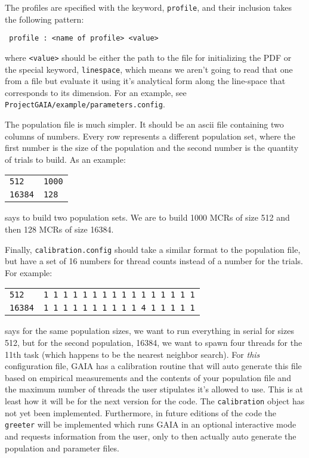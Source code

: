 \documentclass[10pt,a4paper,final]{article}
\numberwithin{equation}{section}
\newenvironment{Table}
  {\par\bigskip\noindent\minipage{\columnwidth}\centering}
    {\endminipage\par\bigskip}
\begin{document}
\begin{multicols}{2}[]
			The profiles are specified with the keyword, \texttt{profile}, and their
			inclusion takes the following pattern:

			\begin{center}
				\texttt{ profile : <name of profile> <value> }
			\end{center}

			\noindent
			where \texttt{<value>} should be either the path to the file for initializing
			the PDF or the special keyword, \texttt{linespace}, which means we aren't
			going to read that one from a file but evaluate it using it's analytical form
			along the line-space that corresponds to its dimension. For an example, see
			\texttt{ProjectGAIA/example/parameters.config}.
			
			The population file is much simpler. It should be an ascii file containing two
			columns of numbers. Every row represents a different population set, where
			the first number is the size of the population and the second number is the
			quantity of trials to build. As an example:

			\begin{Table}
			\begin{tabular}{ll}
				\texttt{512} & \texttt{1000} \\
				\texttt{16384} & \texttt{128} 
			\end{tabular}
			\end{Table}

			\noindent
			says to build two population sets. We are to build 1000 MCRs of size 512 and then
			128 MCRs of size 16384.

			Finally, \texttt{calibration.config} should take a similar format to the 
			population file, but have a set of 16 numbers for thread counts instead of a number
			for the trials. For example:

			\begin{Table}
			\begin{tabular}{ll}
				\texttt{512} & \texttt{1 1 1 1 1 1 1 1 1 1 1 1 1 1 1 1} \\
				\texttt{16384} & \texttt{1 1 1 1 1 1 1 1 1 1 4 1 1 1 1 1}
			\end{tabular}
			\end{Table}

			\noindent
			says for the same population sizes, we want to run everything in serial for sizes
			512, but for the second population, 16384, we want to spawn four threads for the
			11th task (which happens to be the nearest neighbor search). For \textit{this}
			configuration file, GAIA has a calibration routine that will auto generate this
			file based on empirical measurements and the contents of your population file
			and the maximum number of threads the user stipulates it's allowed to use.
			This is at least how it will be for the next version for the code. The 
			\texttt{calibration} object has not yet been implemented. Furthermore, in future
			editions of the code the \texttt{greeter} will be implemented which runs GAIA
			in an optional interactive mode and requests information from the user, only
			to then actually auto generate the population and parameter files.


\end{multicols}
\end{document}
